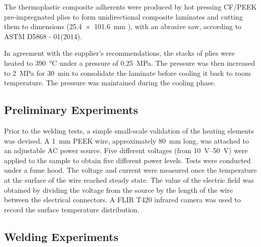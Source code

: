 \documentclass[11pt,review,times]{elsarticle}
\begin{document}
The thermoplastic composite adherents were produced by hot pressing CF/PEEK pre-impregnated plies to form unidirectional composite laminates and cutting them to dimensions (\SI{25.4 x 101.6}{\milli\metre} ), with an abrasive saw, according to ASTM D5868 - 01(2014). 

In agreement with the supplier’s recommendations, the stacks of plies were heated to \SI{390}{\celsius} under a pressure of \SI{0.25}{\MPa}. 
The pressure was then increased to \SI{2}{\MPa} for \SI{30}{\minute} to consolidate the laminate before cooling it back to room temperature. 
The pressure was maintained during the cooling phase. 

\subsection{Preliminary Experiments}

Prior to the welding tests, a simple small-scale validation of the heating elements was devised. 
A \SI{1}{\milli\metre} PEEK wire, approximately \SI{80}{\milli\metre} long, was attached to an adjustable AC power source. 
Five different voltages (from \SIrange{10}{50}{\volt}) were applied to the sample to obtain five different power levels. 
Tests were conducted under a fume hood. 
The voltage and current were measured once the temperature at the surface of the wire reached steady state. 
The value of the electric field was obtained by dividing the voltage from the source by the length of the wire between the electrical connectors. 
A FLIR T420 infrared camera was used to record the surface temperature distribution. 

\subsection{Welding Experiments}
\end{document}
